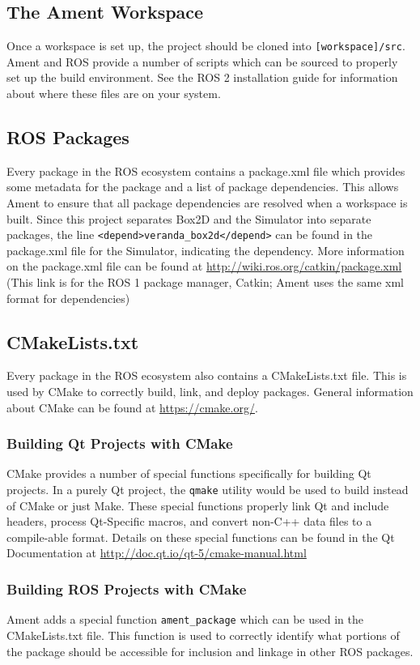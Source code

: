 \subsection{The Ament Workspace}
Once a workspace is set up, the project should be cloned into \lstinline|[workspace]/src|.
Ament and ROS provide a number of scripts which can be sourced to properly set up the build environment. See the ROS 2 installation guide for information about where these files are on your system.

\subsection{ROS Packages}
Every package in the ROS ecosystem contains a package.xml file which provides some metadata for the package and a list of package dependencies. This allows Ament to ensure that all package dependencies are resolved when a workspace is built. Since this project separates Box2D and the Simulator into separate packages, the line \lstinline|<depend>veranda_box2d</depend>| can be found in the package.xml file for the Simulator, indicating the dependency.  More information on the package.xml file can be found at \url{http://wiki.ros.org/catkin/package.xml} (This link is for the ROS 1 package manager, Catkin; Ament uses the same xml format for dependencies)

\subsection{CMakeLists.txt}
Every package in the ROS ecosystem also contains a CMakeLists.txt file. This is used by CMake to correctly build, link, and deploy packages. General information about CMake can be found at \url{https://cmake.org/}.

\subsubsection*{Building Qt Projects with CMake}
CMake provides a number of special functions specifically for building Qt projects. In a purely Qt project, the \lstinline|qmake| utility would be used to build instead of CMake or just Make. These special functions properly link Qt and include headers, process Qt-Specific macros, and convert non-C++ data files to a compile-able format. Details on these special functions can be found in the Qt Documentation at \url{http://doc.qt.io/qt-5/cmake-manual.html}

\subsubsection*{Building ROS Projects with CMake}
Ament adds a special function \lstinline|ament_package| which can be used in the CMakeLists.txt file. This function is used to correctly identify what portions of the package should be accessible for inclusion and linkage in other ROS packages.

